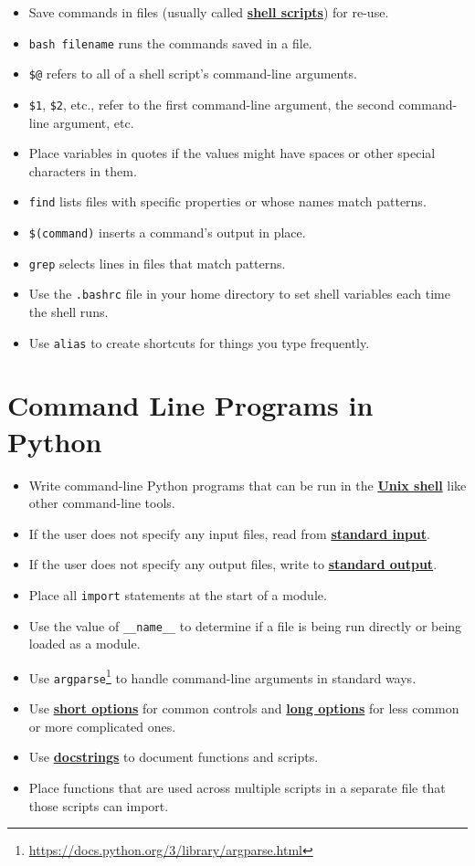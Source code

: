 \documentclass[
]{krantz}
\providecommand{\tightlist}{%
  \setlength{\itemsep}{0pt}\setlength{\parskip}{0pt}}
\renewcommand{\href}[2]{#2\footnote{\url{#1}}}
\newcommand{\gref}[2]{\hyperlink{#2}{\textbf{#1}}}
\begin{document}
\begin{itemize}
\tightlist
\item
  Save commands in files (usually called \gref{shell scripts}{shell\_script}) for re-use.
\item
  \texttt{bash\ filename} runs the commands saved in a file.
\item
  \texttt{\$@} refers to all of a shell script's command-line arguments.
\item
  \texttt{\$1}, \texttt{\$2}, etc., refer to the first command-line argument, the second command-line argument, etc.
\item
  Place variables in quotes if the values might have spaces or other special characters in them.
\item
  \texttt{find} lists files with specific properties or whose names match patterns.
\item
  \texttt{\$(command)} inserts a command's output in place.
\item
  \texttt{grep} selects lines in files that match patterns.
\item
  Use the \texttt{.bashrc} file in your home directory to set shell variables each time the shell runs.
\item
  Use \texttt{alias} to create shortcuts for things you type frequently.
\end{itemize}

\hypertarget{command-line-programs-in-python-1}{%
\section{Command Line Programs in Python}\label{command-line-programs-in-python-1}}

\begin{itemize}
\tightlist
\item
  Write command-line Python programs that can be run in the \gref{Unix shell}{shell} like other command-line tools.
\item
  If the user does not specify any input files, read from \gref{standard input}{stdin}.
\item
  If the user does not specify any output files, write to \gref{standard output}{stdout}.
\item
  Place all \texttt{import} statements at the start of a module.
\item
  Use the value of \texttt{\_\_name\_\_} to determine if a file is being run directly or being loaded as a module.
\item
  Use \href{https://docs.python.org/3/library/argparse.html}{\texttt{argparse}} to handle command-line arguments in standard ways.
\item
  Use \gref{short options}{short\_option} for common controls and \gref{long options}{long\_option} for less common or more complicated ones.
\item
  Use \gref{docstrings}{docstring} to document functions and scripts.
\item
  Place functions that are used across multiple scripts in a separate file that those scripts can import.
\end{itemize}
\end{document}

